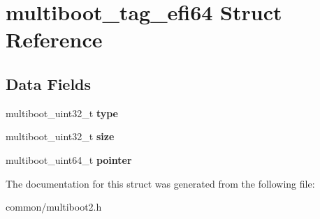 \hypertarget{structmultiboot__tag__efi64}{}\section{multiboot\+\_\+tag\+\_\+efi64 Struct Reference}
\label{structmultiboot__tag__efi64}
\subsection*{Data Fields}
\begin{DoxyCompactItemize}
\item 
multiboot\+\_\+uint32\+\_\+t {\bfseries type}\hypertarget{structmultiboot__tag__efi64_a202cbd2c0caeed69918e5fd254aaf34b}{}\label{structmultiboot__tag__efi64_a202cbd2c0caeed69918e5fd254aaf34b}

\item 
multiboot\+\_\+uint32\+\_\+t {\bfseries size}\hypertarget{structmultiboot__tag__efi64_a828aaa2c68b86ebc898fb44c4cceb5c2}{}\label{structmultiboot__tag__efi64_a828aaa2c68b86ebc898fb44c4cceb5c2}

\item 
multiboot\+\_\+uint64\+\_\+t {\bfseries pointer}\hypertarget{structmultiboot__tag__efi64_a23a86b6bf37df565a7435fecc0a21a71}{}\label{structmultiboot__tag__efi64_a23a86b6bf37df565a7435fecc0a21a71}

\end{DoxyCompactItemize}


The documentation for this struct was generated from the following file\+:\begin{DoxyCompactItemize}
\item 
common/multiboot2.\+h\end{DoxyCompactItemize}
